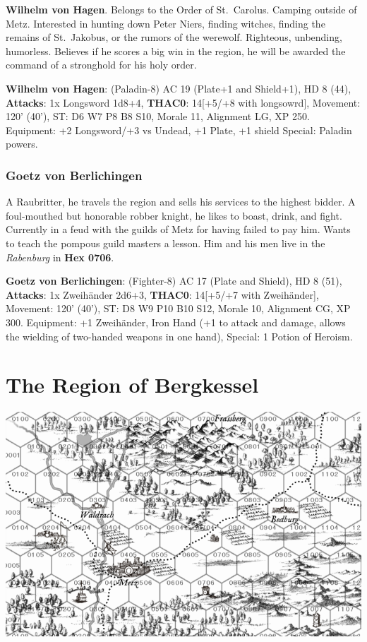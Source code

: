 \documentclass[
]{book}
\begin{document}
\textbf{Wilhelm von Hagen}. Belongs to the Order of St.~Carolus. Camping outside of Metz. Interested in hunting down Peter Niers, finding witches, finding the remains of St.~Jakobus, or the rumors of the werewolf. Righteous, unbending, humorless. Believes if he scores a big win in the region, he will be awarded the command of a stronghold for his holy order.

\textbf{Wilhelm von Hagen}: (Paladin-8) AC 19 (Plate+1 and Shield+1), HD 8 (44), \textbf{Attacks}: 1x Longsword 1d8+4, \textbf{THAC0}: 14{[}+5/+8 with longsowrd{]}, Movement: 120' (40'), ST: D6 W7 P8 B8 S10, Morale 11, Alignment LG, XP 250. Equipment: +2 Longsword/+3 vs Undead, +1 Plate, +1 shield Special: Paladin powers.

\subsection{Goetz von Berlichingen}\label{goetz-von-berlichingen}

A Raubritter, he travels the region and sells his services to the highest bidder. A foul-mouthed but honorable robber knight, he likes to boast, drink, and fight. Currently in a feud with the guilds of Metz for having failed to pay him. Wants to teach the pompous guild masters a lesson. Him and his men live in the \emph{Rabenburg} in \textbf{Hex 0706}.

\textbf{Goetz von Berlichingen}: (Fighter-8) AC 17 (Plate and Shield), HD 8 (51), \textbf{Attacks}: 1x Zweihänder 2d6+3, \textbf{THAC0}: 14{[}+5/+7 with Zweihänder{]}, Movement: 120' (40'), ST: D8 W9 P10 B10 S12, Morale 10, Alignment CG, XP 300. Equipment: +1 Zweihänder, Iron Hand (+1 to attack and damage, allows the wielding of two-handed weapons in one hand), Special: 1 Potion of Heroism.

\chapter{The Region of Bergkessel}\label{region}

\begin{center}\includegraphics[width=1\linewidth]{graphics/bergkessel_old_2024} \end{center}
\end{document}
